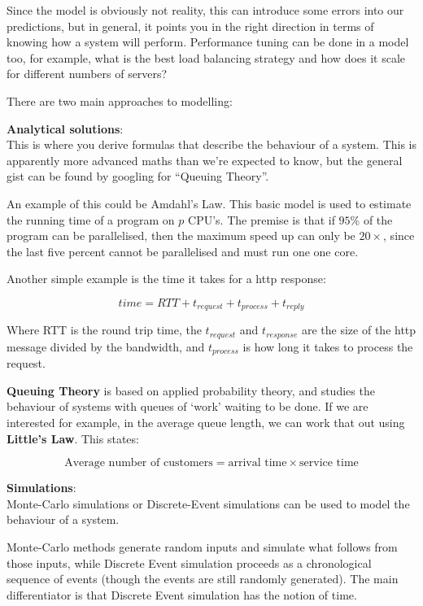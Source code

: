 Since the model is obviously not reality, this can introduce some errors into
our predictions, but in general, it points you in the right direction in terms
of knowing how a system will perform. Performance tuning can be done in a model
too, for example, what is the best load balancing strategy and how does it scale
for different numbers of servers?

There are two main approaches to modelling:

\begin{description}
  \item \textbf{Analytical solutions}:\\
    This is where you derive formulas that describe the behaviour of a system.
    This is apparently more advanced maths than we're expected to know, but the
    general gist can be found by googling for ``Queuing Theory''.

    An example of this could be Amdahl's Law. This basic model is used to
    estimate the running time of a program on $p$ CPU's. The premise is that
    if $95\%$ of the program can be parallelised, then the maximum speed up can 
    only be $20\times$, since the last five percent cannot be parallelised and
    must run one one core.

    Another simple example is the time it takes for a http response:

    \[
      time = RTT + t_{request} + t_{process} + t_{reply}
    \]

    Where RTT is the round trip time, the $t_{request}$ and $t_{response}$ are
    the size of the http message divided by the bandwidth, and $t_{process}$ is 
    how long it takes to process the request.

    \textbf{Queuing Theory} is based on applied probability theory, and studies
    the behaviour of systems with queues of `work' waiting to be done. If we
    are interested for example, in the average queue length, we can work that
    out using \textbf{Little's Law}.  This states:

    \[
      \text{Average number of customers} = \text{arrival time} \times \text{service time}
    \]

  \item \textbf{Simulations}:\\
    Monte-Carlo simulations or Discrete-Event simulations can be used to model
    the behaviour of a system.

    Monte-Carlo methods generate random inputs and simulate what follows from
    those inputs, while Discrete Event simulation proceeds as a chronological
    sequence of events (though the events are still randomly generated). The
    main differentiator is that Discrete Event simulation has the notion of
    time.
\end{description} 


